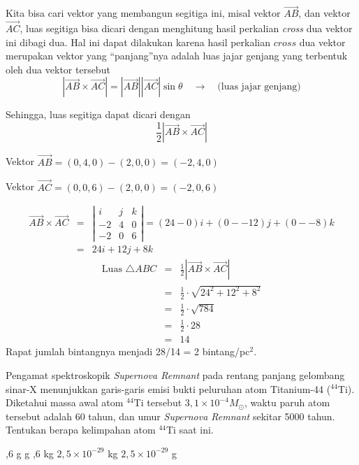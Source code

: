 \documentclass[11pt,fleqn]{exam}
\begin{document}
\begin{questions}
Kita bisa cari vektor yang membangun segitiga ini, misal vektor $\overrightarrow{AB}$, dan vektor $\overrightarrow{AC}$, luas segitiga bisa dicari dengan menghitung hasil perkalian \textit{cross} dua vektor ini dibagi dua. Hal ini dapat dilakukan karena hasil perkalian $cross$ dua vektor merupakan vektor yang ``panjang''nya adalah luas jajar genjang yang terbentuk oleh dua vektor tersebut
$$\left\vert \overrightarrow{AB} \times \overrightarrow{AC} \right\vert = \left\vert \overrightarrow{AB} \right\vert \left\vert \overrightarrow{AC} \right\vert \sin{\theta} \quad \rightarrow \quad \text{(luas jajar genjang)}$$

Sehingga, luas segitiga dapat dicari dengan 
$$\frac{1}{2} \left\vert \overrightarrow{AB} \times \overrightarrow{AC} \right\vert$$

Vektor $\overrightarrow{AB} = (0, 4, 0) - (2, 0, 0) = (-2, 4, 0)$

Vektor $\overrightarrow{AC} = (0, 0, 6) - (2, 0, 0) = (-2, 0, 6)$

\begin{eqnarray*}
\overrightarrow{AB} \times \overrightarrow{AC} &=& \left\vert 
\begin{array}{ccc}
i & j & k \\
-2 & 4 & 0 \\
-2 & 0 & 6
\end{array}
\right\vert = (24 - 0)i + (0 - -12)j + (0 - -8)k\\
&=& 24i + 12j + 8k
\end{eqnarray*}
\begin{eqnarray*}
\text{Luas } \triangle ABC &=& \frac{1}{2} \left\vert \overrightarrow{AB} \times \overrightarrow{AC} \right\vert \\
&=& \frac{1}{2} \cdot \sqrt{24^2 + 12^2 + 8^2}\\
&=& \frac{1}{2} \cdot \sqrt{784}\\
&=& \frac{1}{2} \cdot 28 \\
&=& 14
\end{eqnarray*}
Rapat jumlah bintangnya menjadi 28/14 = 2 bintang/pc$^2$.



\question Pengamat spektroskopik \textit{Supernova Remnant} pada rentang panjang gelombang sinar-X menunjukkan garis-garis emisi bukti peluruhan atom Titanium-44 ($^{44}$Ti). Diketahui massa awal atom $^{44}$Ti tersebut $3,1 \times 10^{-4} M_{\odot}$, waktu paruh atom tersebut adalah 60 tahun, dan umur \textit{Supernova Remnant} sekitar 5000 tahun. Tentukan berapa kelimpahan atom  $^{44}$Ti saat ini.
\begin{choices}
,6 g
 g
,6 kg
\choice $2,5 \times 10^{-29}$ kg
\choice $2,5 \times 10^{-29}$ g
\end{choices}


\end{questions}
\end{document}
